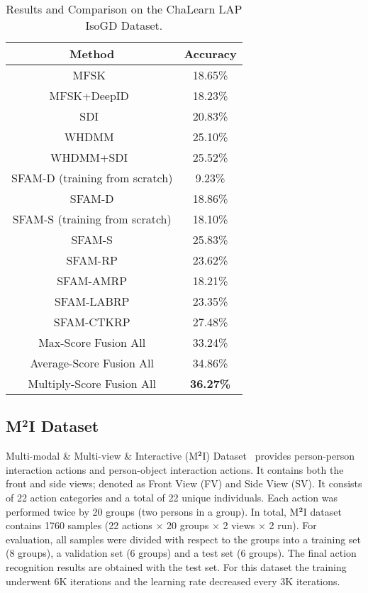 \documentclass[10pt,twocolumn,letterpaper]{article}
\begin{document}
\begin{table}[!ht]
\centering
\begin{tabular}{|c|c|}
\hline
Method & Accuracy \\
\hline
MFSK~\cite{pami16Jun,wanchalearn}  & 18.65\%\\
\hline
MFSK+DeepID~\cite{pami16Jun,wanchalearn}  & 18.23\%\\
\hline
SDI~\cite{bilen2016dynamic}  & 20.83\%\\
\hline
WHDMM~\cite{pichaoTHMS}  & 25.10\%\\
\hline
WHDMM+SDI~\cite{pichaoTHMS,bilen2016dynamic}  & 25.52\%\\
\hline\hline
SFAM-D (training from scratch) & 9.23\%\\
\hline
SFAM-D & 18.86\%\\
\hline
SFAM-S (training from scratch)  & 18.10\%\\
\hline
SFAM-S  & 25.83\%\\
\hline
SFAM-RP  & 23.62\%\\
\hline
SFAM-AMRP  & 18.21\%\\
\hline
SFAM-LABRP  & 23.35\%\\
\hline
SFAM-CTKRP  & 27.48\%\\
\hline
Max-Score Fusion All  & 33.24\%\\
\hline
Average-Score Fusion All  & 34.86\%\\
\hline
Multiply-Score Fusion All  & \textbf{36.27\%}\\
\hline
\end{tabular}
\caption{Results and Comparison on the ChaLearn LAP IsoGD Dataset. \label{table1}}
\end{table}



\subsection{M$^{\textbf{2}}$I Dataset}
Multi-modal \& Multi-view \& Interactive (M$^{\textbf{2}}$I) 
Dataset~\cite{liu2016benchmarking} 
provides person-person interaction 
actions and person-object interaction actions. It contains both the 
front and side views; denoted as Front View (FV) and Side View (SV). It 
consists of 22 action categories and a total of 22 unique individuals. Each 
action was performed twice by 20 groups (two persons in a group). In total, 
M$^{\textbf{2}}$I dataset contains 1760 samples (22 actions $\times$ 20 groups 
$\times$ 2 views $\times$ 2 run).  For evaluation, all samples were divided with respect to the groups into 
a training set (8 groups), a validation set (6 groups) and a test set (6 
groups). The final action recognition results are obtained with the test set. 
For this dataset the training underwent 6K iterations and the learning rate 
decreased every 3K iterations.
 
\end{document}
